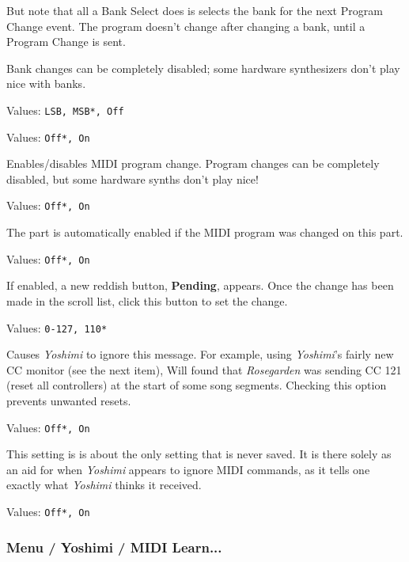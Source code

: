    But note that all a Bank Select does is selects the bank for the next
   Program Change event.  The program doesn't change after changing a bank,
   until a Program Change is sent.

   Bank changes can be completely disabled; some hardware
   synthesizers don't play nice with banks.

   Values: \texttt{LSB, MSB*, Off}


   Values: \texttt{Off*, On}

   Enables/disables MIDI program change.
   Program changes can be completely disabled, but some hardware synths don't
   play nice!


   Values: \texttt{Off*, On}

   The part is automatically enabled if the MIDI program was changed on this
   part.


   Values: \texttt{Off*, On}

   If enabled, a new reddish button, \textbf{Pending}, appears.
   Once the change has been made in the scroll list, click this button
   to set the change.

   Values: \texttt{0-127, 110*}

   Causes \textsl{Yoshimi} to ignore this message.
   For example, using \textsl{Yoshimi}'s fairly new CC monitor (see the next
   item), Will found that \textsl{Rosegarden} was sending CC 121 (reset all
   controllers) at the start of some song segments.  Checking this option
   prevents unwanted resets.

   Values: \texttt{Off*, On}

   This setting is is about the only setting that is never saved. It is there
   solely as an aid for when \textsl{Yoshimi} appears to ignore MIDI commands,
   as it tells one exactly what \textsl{Yoshimi} thinks it received.

   Values: \texttt{Off*, On}

\subsubsection{Menu / Yoshimi / MIDI Learn...}
\label{subsubsec:menu_yoshimi_midi_learn}

